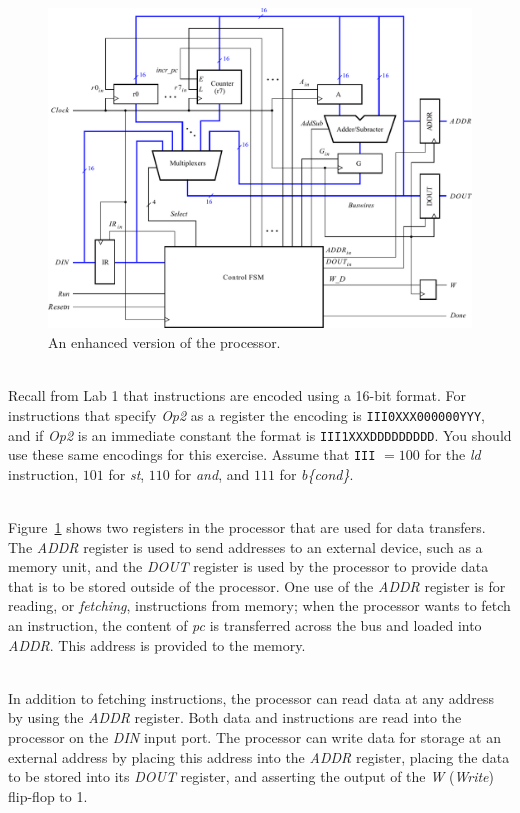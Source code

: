 \documentclass[epsfig,10pt,fullpage]{article}
\begin{document}
\begin{figure}[H]
\begin{center}
\includegraphics[scale = 0.8]{figures/figure12.pdf}
\end{center}
\caption{An enhanced version of the processor.}
\label{fig:fig12}
\end{figure}

~\\
\noindent
Recall from Lab 1 that instructions are encoded using a 16-bit format. For instructions
that specify {\it Op2} as a register the encoding is \texttt{III0XXX000000YYY}, and if {\it Op2}
is an immediate constant the format is \texttt{III1XXXDDDDDDDDD}. You should use these 
same encodings for this exercise. Assume that \texttt{III} $= 100$ for the {\it ld} instruction,
$101$ for {\it st}, $110$ for {\it and}, and $111$ for {\it b\{cond\}}.

~\\
Figure~\ref{fig:fig12} shows two registers in the processor that are used for data transfers. The 
{\it ADDR} register is used to send addresses to an external device, such as a memory unit,
and the {\it DOUT} register is used by the processor to provide data that is to be stored outside 
of the processor. One use of the {\it ADDR} register is for reading, or {\it fetching}, 
instructions from memory; when the processor wants to fetch an instruction, the content
of {\it pc} is transferred across the bus and loaded into {\it ADDR}. This address is 
provided to the memory.

~\\
In addition to fetching instructions, the processor can read data 
at any address by using the {\it ADDR} register. Both data and instructions are read into 
the processor on the {\it DIN} input port.  The processor can write data for storage at 
an external address by placing this address into the {\it ADDR} register, placing the data 
to be stored into its {\it DOUT} register, and asserting the output of the {\it W} 
({\it Write}) flip-flop to 1. 
\end{document}
